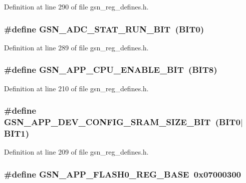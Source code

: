 Definition at line 290 of file gsn\_\-reg\_\-defines.h.

\hypertarget{a00546_accc431589d981464e4762f194ec74421}{
\subsubsection[{GSN\_\-ADC\_\-STAT\_\-RUN\_\-BIT}]{\setlength{\rightskip}{0pt plus 5cm}\#define GSN\_\-ADC\_\-STAT\_\-RUN\_\-BIT~(BIT0)}}
\label{a00546_accc431589d981464e4762f194ec74421}


Definition at line 289 of file gsn\_\-reg\_\-defines.h.

\hypertarget{a00546_ab3fd74d92d5b2029dc783f42ca37c225}{
\subsubsection[{GSN\_\-APP\_\-CPU\_\-ENABLE\_\-BIT}]{\setlength{\rightskip}{0pt plus 5cm}\#define GSN\_\-APP\_\-CPU\_\-ENABLE\_\-BIT~(BIT8)}}
\label{a00546_ab3fd74d92d5b2029dc783f42ca37c225}


Definition at line 210 of file gsn\_\-reg\_\-defines.h.

\hypertarget{a00546_adf6d9784141898661f0dbdfbc5f527df}{
\subsubsection[{GSN\_\-APP\_\-DEV\_\-CONFIG\_\-SRAM\_\-SIZE\_\-BIT}]{\setlength{\rightskip}{0pt plus 5cm}\#define GSN\_\-APP\_\-DEV\_\-CONFIG\_\-SRAM\_\-SIZE\_\-BIT~(BIT0$|$BIT1)}}
\label{a00546_adf6d9784141898661f0dbdfbc5f527df}


Definition at line 209 of file gsn\_\-reg\_\-defines.h.

\hypertarget{a00546_a0f620d9d7c3379e2b748378f0931e623}{
\subsubsection[{GSN\_\-APP\_\-FLASH0\_\-REG\_\-BASE}]{\setlength{\rightskip}{0pt plus 5cm}\#define GSN\_\-APP\_\-FLASH0\_\-REG\_\-BASE~0x07000300}}
\label{a00546_a0f620d9d7c3379e2b748378f0931e623}



